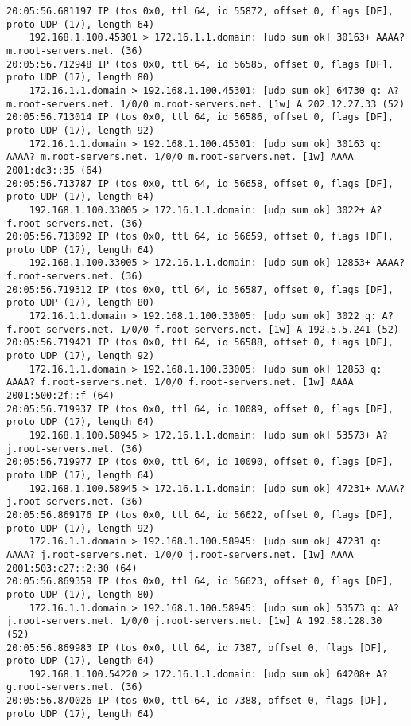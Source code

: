 \documentclass{article}
\begin{document}
{\begin{lstlisting}
20:05:56.681197 IP (tos 0x0, ttl 64, id 55872, offset 0, flags [DF], proto UDP (17), length 64)
    192.168.1.100.45301 > 172.16.1.1.domain: [udp sum ok] 30163+ AAAA? m.root-servers.net. (36)
20:05:56.712948 IP (tos 0x0, ttl 64, id 56585, offset 0, flags [DF], proto UDP (17), length 80)
    172.16.1.1.domain > 192.168.1.100.45301: [udp sum ok] 64730 q: A? m.root-servers.net. 1/0/0 m.root-servers.net. [1w] A 202.12.27.33 (52)
20:05:56.713014 IP (tos 0x0, ttl 64, id 56586, offset 0, flags [DF], proto UDP (17), length 92)
    172.16.1.1.domain > 192.168.1.100.45301: [udp sum ok] 30163 q: AAAA? m.root-servers.net. 1/0/0 m.root-servers.net. [1w] AAAA 2001:dc3::35 (64)
20:05:56.713787 IP (tos 0x0, ttl 64, id 56658, offset 0, flags [DF], proto UDP (17), length 64)
    192.168.1.100.33005 > 172.16.1.1.domain: [udp sum ok] 3022+ A? f.root-servers.net. (36)
20:05:56.713892 IP (tos 0x0, ttl 64, id 56659, offset 0, flags [DF], proto UDP (17), length 64)
    192.168.1.100.33005 > 172.16.1.1.domain: [udp sum ok] 12853+ AAAA? f.root-servers.net. (36)
20:05:56.719312 IP (tos 0x0, ttl 64, id 56587, offset 0, flags [DF], proto UDP (17), length 80)
    172.16.1.1.domain > 192.168.1.100.33005: [udp sum ok] 3022 q: A? f.root-servers.net. 1/0/0 f.root-servers.net. [1w] A 192.5.5.241 (52)
20:05:56.719421 IP (tos 0x0, ttl 64, id 56588, offset 0, flags [DF], proto UDP (17), length 92)
    172.16.1.1.domain > 192.168.1.100.33005: [udp sum ok] 12853 q: AAAA? f.root-servers.net. 1/0/0 f.root-servers.net. [1w] AAAA 2001:500:2f::f (64)
20:05:56.719937 IP (tos 0x0, ttl 64, id 10089, offset 0, flags [DF], proto UDP (17), length 64)
    192.168.1.100.58945 > 172.16.1.1.domain: [udp sum ok] 53573+ A? j.root-servers.net. (36)
20:05:56.719977 IP (tos 0x0, ttl 64, id 10090, offset 0, flags [DF], proto UDP (17), length 64)
    192.168.1.100.58945 > 172.16.1.1.domain: [udp sum ok] 47231+ AAAA? j.root-servers.net. (36)
20:05:56.869176 IP (tos 0x0, ttl 64, id 56622, offset 0, flags [DF], proto UDP (17), length 92)
    172.16.1.1.domain > 192.168.1.100.58945: [udp sum ok] 47231 q: AAAA? j.root-servers.net. 1/0/0 j.root-servers.net. [1w] AAAA 2001:503:c27::2:30 (64)
20:05:56.869359 IP (tos 0x0, ttl 64, id 56623, offset 0, flags [DF], proto UDP (17), length 80)
    172.16.1.1.domain > 192.168.1.100.58945: [udp sum ok] 53573 q: A? j.root-servers.net. 1/0/0 j.root-servers.net. [1w] A 192.58.128.30 (52)
20:05:56.869983 IP (tos 0x0, ttl 64, id 7387, offset 0, flags [DF], proto UDP (17), length 64)
    192.168.1.100.54220 > 172.16.1.1.domain: [udp sum ok] 64208+ A? g.root-servers.net. (36)
20:05:56.870026 IP (tos 0x0, ttl 64, id 7388, offset 0, flags [DF], proto UDP (17), length 64)

\end{lstlisting}}
\end{document}

